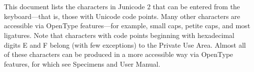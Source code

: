 \documentclass[12pt,letterpaper,openany]{book}
\begin{document}
\begin{titlepage}
\huge\noindent
{\color{myRed}}\\[5cm]
\Huge{} \\[1cm]
\huge{} \\[1cm]
\Huge{} \\[1cm]
\huge{} \\[1ex]
\Large{}\\
\vfill
{\color{myRed}}
\end{titlepage}
\mainmatter

{\noindent\semiexpanded This document lists the characters in Junicode 2 that can be entered
from the keyboard—that is, those with Unicode code points. Many other
characters are accessible via OpenType features—for example, small
caps, petite caps, and most ligatures. Note that characters with code
points beginning with hexadecimal digits E and F belong (with few exceptions) to the Private
Use Area. Almost all of these characters can be produced in a more
accessible way via
OpenType features, for which see {\semiexpandeditalic Specimens and User
  Manual}.}
\end{document}
